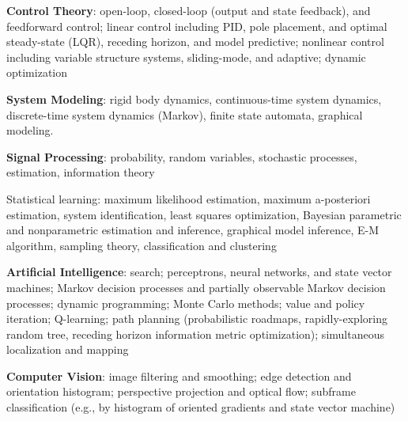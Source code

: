 \begin{loneinnerlist}
    \item \textbf{Control Theory}: open-loop, closed-loop (output and state feedback), and feedforward control; linear control including PID, pole placement, and optimal steady-state (LQR), receding horizon, and model predictive; nonlinear control including variable structure systems, sliding-mode, and adaptive; dynamic optimization
    \item \textbf{System Modeling}: rigid body dynamics, continuous-time system dynamics, discrete-time system dynamics (Markov), finite state automata, graphical modeling.
    \item \textbf{Signal Processing}: probability, random variables, stochastic processes, estimation, information theory
    \item Statistical learning: maximum likelihood estimation, maximum a-posteriori estimation, system identification, least squares optimization, Bayesian parametric and nonparametric estimation and inference, graphical model inference, E-M algorithm, sampling theory, classification and clustering
    \item \textbf{Artificial Intelligence}: search; perceptrons, neural networks, and state vector machines; Markov decision processes and partially observable Markov decision processes; dynamic programming; Monte Carlo methods; value and policy iteration; Q-learning; path planning (probabilistic roadmaps, rapidly-exploring random tree, receding horizon information metric optimization); simultaneous localization and mapping
    \item \textbf{Computer Vision}: image filtering and smoothing; edge detection and orientation histogram; perspective projection and optical flow; subframe classification (e.g., by histogram of oriented gradients and state vector machine)
\end{loneinnerlist}
